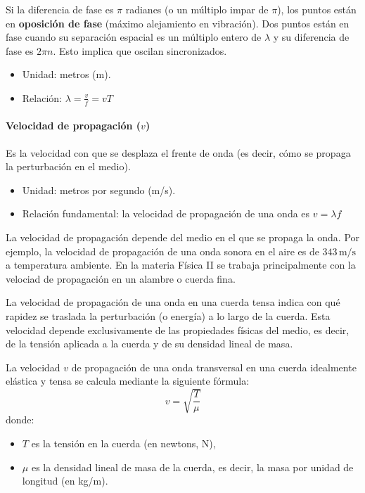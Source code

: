 Si la diferencia de fase es \(\pi\) radianes (o un múltiplo impar de \(\pi\)), los puntos están en \textbf{oposición de fase} (máximo alejamiento en vibración). Dos puntos están en fase cuando su separación espacial es un múltiplo entero de \(\lambda\) y su diferencia de fase es \(2\pi n\). Esto implica que oscilan sincronizados.

\begin{itemize}
  \item Unidad: metros (m).
  \item Relación: \(\lambda = \frac{v}{f} = v T\)
\end{itemize}

\paragraph{Velocidad de propagación (\(v\))}

Es la velocidad con que se desplaza el frente de onda (es decir, cómo se propaga la perturbación en el medio).

\begin{itemize}
  \item Unidad: metros por segundo (m/s).
  \item Relación fundamental: la velocidad de propagación de una onda es \(v = \lambda f\)
\end{itemize}

La velocidad de propagación depende del medio en el que se propaga la onda. Por ejemplo, la velocidad de propagación de una onda sonora en el aire es de \(343\, \text{m/s}\) a temperatura ambiente. En la materia Física II se trabaja principalmente con la velociad de propagación en un alambre o cuerda fina. 

La velocidad de propagación de una onda en una cuerda tensa indica con qué rapidez se traslada la perturbación (o energía) a lo largo de la cuerda. Esta velocidad depende exclusivamente de las propiedades físicas del medio, es decir, de la tensión aplicada a la cuerda y de su densidad lineal de masa.

La velocidad \(v\) de propagación de una onda transversal en una cuerda idealmente elástica y tensa se calcula mediante la siguiente fórmula:
\[
v = \sqrt{\frac{T}{\mu}}
\]
donde:
\begin{itemize}
  \item \(T\) es la tensión en la cuerda (en newtons, N),
  \item \(\mu\) es la densidad lineal de masa de la cuerda, es decir, la masa por unidad de longitud (en kg/m).
\end{itemize}

